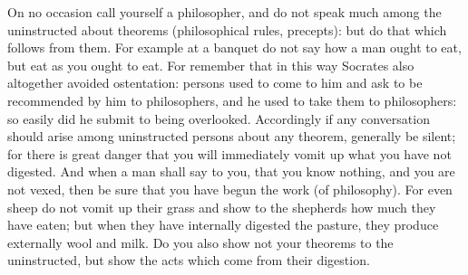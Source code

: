 On no  occasion call yourself  a philosopher, and do  not speak much  among the
uninstructed about theorems (philosophical rules,  precepts): but do that which
follows from them. For example at a banquet  do not say how a man ought to eat,
but  eat as  you ought  to eat.  For remember  that in  this way  Socrates also
altogether  avoided ostentation:  persons used  to come  to him  and ask  to be
recommended by him  to philosophers, and he used to  take them to philosophers:
so easily  did he submit to  being overlooked. Accordingly if  any conversation
should arise among uninstructed persons about any theorem, generally be silent;
for there is great danger that you  will immediately vomit up what you have not
digested. And when a  man shall say to you, that you know  nothing, and you are
not vexed, then be sure that you  have begun the work (of philosophy). For even
sheep do not vomit up their grass and  show to the shepherds how much they have
eaten;  but  when they  have  internally  digested  the pasture,  they  produce
externally  wool  and  milk.  Do  you  also  show  not  your  theorems  to  the
uninstructed, but show the acts which come from their digestion.
